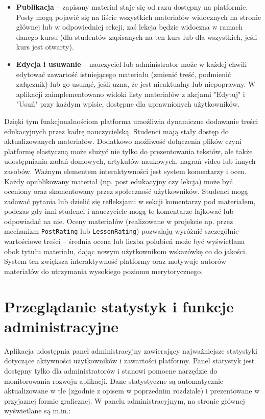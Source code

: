 \begin{itemize}
\item \textbf{Publikacja} – zapisany materiał staje się od razu dostępny na platformie. Posty mogą pojawić się na liście wszystkich materiałów widocznych na stronie głównej lub w odpowiedniej sekcji, zaś lekcja będzie widoczna w ramach danego kursu (dla studentów zapisanych na ten kurs lub dla wszystkich, jeśli kurs jest otwarty).
\item \textbf{Edycja i usuwanie} – nauczyciel lub administrator może w każdej chwili edytować zawartość istniejącego materiału (zmienić treść, podmienić załącznik) lub go usunąć, jeśli uzna, że jest nieaktualny lub niepoprawny. W aplikacji zaimplementowano widoki listy materiałów z akcjami "Edytuj" i "Usuń" przy każdym wpisie, dostępne dla uprawnionych użytkowników.
\end{itemize} Dzięki tym funkcjonalnościom platforma umożliwia dynamiczne dodawanie treści edukacyjnych przez kadrę nauczycielską. Studenci mają stały dostęp do aktualizowanych materiałów. Dodatkowo możliwość dołączenia plików czyni platformę elastyczną może służyć nie tylko do prezentowania tekstów, ale także udostępniania zadań domowych, artykułów naukowych, nagrań video lub innych zasobów. Ważnym elementem interaktywności jest system komentarzy i ocen. Każdy opublikowany materiał (np. post edukacyjny czy lekcja) może być oceniony oraz skomentowany przez społeczność użytkowników. Studenci mogą zadawać pytania lub dzielić się refleksjami w sekcji komentarzy pod materiałem, podczas gdy inni studenci i nauczyciele mogą te komentarze lajkować lub odpowiadać na nie. Oceny materiałów (realizowane w projekcie np. przez mechanizm \texttt{PostRating} lub \texttt{LessonRating}) pozwalają wyróżnić szczególnie wartościowe treści – średnia ocena lub liczba polubień może być wyświetlana obok tytułu materiału, dając nowym użytkownikom wskazówkę co do jakości. System ten zwiększa interaktywność platformy oraz motywuje autorów materiałów do utrzymania wysokiego poziomu merytorycznego. \section{Przeglądanie statystyk i funkcje administracyjne} Aplikacja udostępnia panel administracyjny zawierający najważniejsze statystyki dotyczące aktywności użytkowników i zawartości platformy. Panel statystyk jest dostępny tylko dla administratorów i stanowi pomocne narzędzie do monitorowania rozwoju aplikacji. Dane statystyczne są automatycznie aktualizowane w tle (zgodnie z opisem w poprzednim rozdziale) i prezentowane w przyjaznej formie graficznej. W panelu administracyjnym, na stronie głównej wyświetlane są m.in.: \begin{itemize}

\end{itemize}
